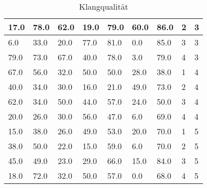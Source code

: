 \begin{table}[!ht]
{\begin{tabular}{|l|l|l|l|l|l|l|l|l|}
17.0                          & 78.0               & 62.0                   & 19.0                        & 79.0           & 60.0             & 86.0                   & 2              & 3                    \\ \hline
6.0                           & 33.0               & 20.0                   & 77.0                        & 81.0           & 0.0              & 85.0                   & 3              & 3                    \\ \hline
79.0                          & 73.0               & 67.0                   & 40.0                        & 78.0           & 3.0              & 79.0                   & 4              & 3                    \\ \hline
67.0                          & 56.0               & 32.0                   & 50.0                        & 50.0           & 28.0             & 38.0                   & 1              & 4                    \\ \hline
40.0                          & 34.0               & 30.0                   & 16.0                        & 21.0           & 49.0             & 73.0                   & 2              & 4                    \\ \hline
62.0                          & 34.0               & 50.0                   & 44.0                        & 57.0           & 24.0             & 50.0                   & 3              & 4                    \\ \hline
20.0                          & 26.0               & 30.0                   & 56.0                        & 47.0           & 6.0              & 69.0                   & 4              & 4                    \\ \hline
15.0                          & 38.0               & 26.0                   & 49.0                        & 53.0           & 20.0             & 70.0                   & 1              & 5                    \\ \hline
38.0                          & 50.0               & 22.0                   & 15.0                        & 59.0           & 6.0              & 70.0                   & 2              & 5                    \\ \hline
45.0                          & 49.0               & 23.0                   & 29.0                        & 66.0           & 15.0             & 84.0                   & 3              & 5                    \\ \hline
18.0                          & 72.0               & 32.0                   & 50.0                        & 57.0           & 0.0              & 68.0                   & 4              & 5                    \\ \hline
\end{tabular}%
}
\caption {Klangqualität}
\end{table}

